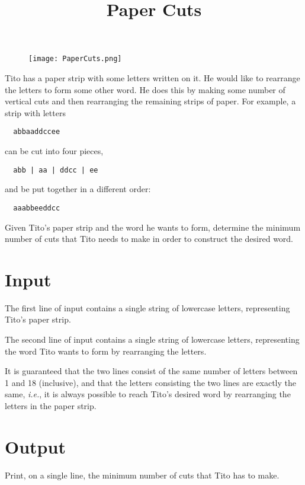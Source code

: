 \documentclass{article}
\title{Paper Cuts}
\date{}
\begin{document}
\maketitle
\begin{figure}[h!]
\centering
\texttt{[image: PaperCuts.png]}
\end{figure}


Tito has a paper strip with some letters written on it.
He would like to rearrange the letters to form some other word.
He does this by making some number of vertical cuts and then
rearranging the remaining strips of paper. For example, a strip with letters

\begin{verbatim}
  abbaaddccee
\end{verbatim}

can be cut into four pieces,

\begin{verbatim}
  abb | aa | ddcc | ee
\end{verbatim}

and be put together in a different order:

\begin{verbatim}
  aaabbeeddcc
\end{verbatim}

Given Tito's paper strip and the word he wants to form,
determine the minimum number of cuts that Tito needs to make
in order to construct the desired word.

\section{Input}

The first line of input contains a single string of lowercase letters,
representing Tito's paper strip.

The second line of input contains a single string of lowercase letters,
representing the word Tito wants to form by rearranging the letters.

It is guaranteed that the two lines consist of the same number of letters
between 1 and 18 (inclusive), and that the letters consisting the two lines
are exactly the same, \emph{i.e.}, it is always possible to reach Tito's desired
word by rearranging the letters in the paper strip.

\section{Output}

Print, on a single line, the minimum number of cuts that Tito has to make.

\end{document}
